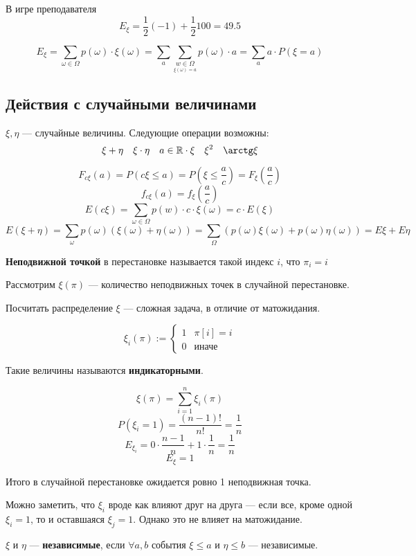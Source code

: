 В игре преподавателя $$E_\xi=\frac{1}{2}(-1)+\frac{1}{2}100 = 49.5$$

$$E_\xi=\sum\limits_{\omega \in \Omega} p(\omega) \cdot \xi(\omega)=\sum\limits_{a}\sum\limits_{\underset{\xi(\omega) = a}{w\in\Omega}}p(\omega)\cdot a=\sum\limits_{a}a\cdot P(\xi=a)$$

\subsection{Действия с случайными величинами}

$\xi, \eta$ --- случайные величины. Следующие операции возможны: $$\xi+\eta \quad \xi\cdot\eta \quad a\in\R \cdot \xi \quad \xi^2 \quad \arctg \xi$$

$$F_{c\xi}(a)=P(c\xi\leq a) = P(\xi\leq\frac{a}{c})=F_\xi\left(\frac{a}{c}\right)$$
$$f_{c\xi}(a)=f_\xi\left(\frac{a}{c}\right)$$
$$E(c\xi)=\sum\limits_{\omega\in\Omega} p(w)\cdot c\cdot \xi(\omega) = c\cdot E(\xi)$$
$$E(\xi+\eta)=\sum\limits_{\omega}p(\omega)(\xi(\omega)+\eta(\omega))=\sum\limits_{\Omega} (p(\omega)\xi(\omega)+p(\omega)\eta(\omega))=E\xi+E\eta$$

\begin{definition}
    \textbf{Неподвижной точкой} в перестановке называется такой индекс $i$, что $\pi_i=i$
\end{definition}

Рассмотрим $\xi(\pi)$ --- количество неподвижных точек в случайной перестановке.

Посчитать распределение $\xi$ --- сложная задача, в отличие от матожидания.

$$\xi_i(\pi):=\begin{cases}
    1 & \pi[i]=i \\
    0 & \text{иначе}
\end{cases}$$

Такие величины называются \textbf{индикаторными}.

$$\xi(\pi)=\sum\limits_{i=1}^n \xi_i(\pi)$$
$$P(\xi_i=1)=\frac{(n-1)!}{n!}=\frac{1}{n}$$
$$E_{\xi_i}=0\cdot\frac{n-1}{n}+1\cdot\frac{1}{n}=\frac{1}{n}$$
$$E_\xi = 1$$

Итого в случайной перестановке ожидается ровно 1 неподвижная точка.

Можно заметить, что $\xi_i$ вроде как влияют друг на друга --- если все, кроме одной $\xi_i=1$, то и оставшаяся $\xi_j=1$. Однако это не влияет на матожидание.

\begin{definition}
    $\xi$ и $\eta$ --- \textbf{независимые}, если $\forall a, b$ события $\xi\leq a$ и $\eta\leq b$ --- независимые.
\end{definition}

